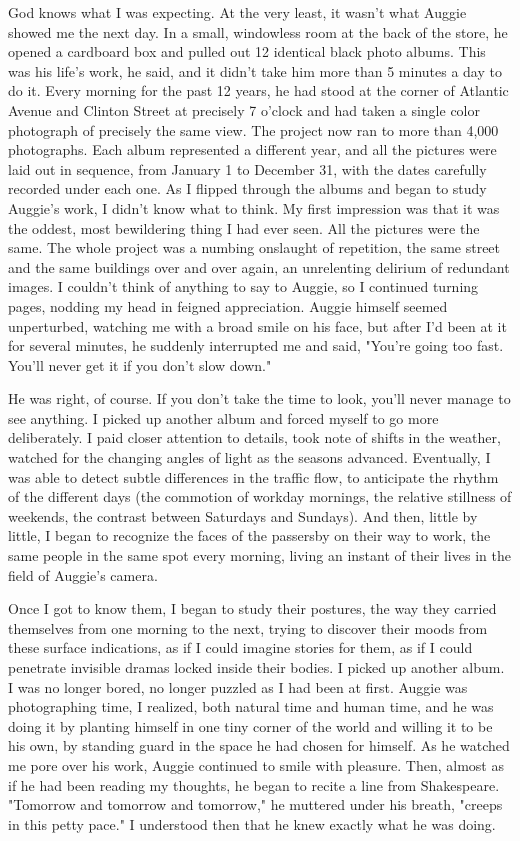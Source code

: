 \documentclass[10pt,a4paper]{article}
\begin{document}
God knows what I was expecting. At the very least, it wasn't what Auggie showed me the next day. In a small, windowless room at the back of the store, he opened a cardboard box and pulled out 12 identical black photo albums. This was his life's work, he said, and it didn't take him more than 5 minutes a day to do it. Every morning for the past 12 years, he had stood at the corner of Atlantic Avenue and Clinton Street at precisely 7 o'clock and had taken a single color photograph of precisely the same view. The project now ran to more than 4,000 photographs. Each album represented a different year, and all the pictures were laid out in sequence, from January 1 to December 31, with the dates carefully recorded under each one.
As I flipped through the albums and began to study Auggie's work, I didn't know what to think. My first impression was that it was the oddest, most bewildering thing I had ever seen. All the pictures were the same. The whole project was a numbing onslaught of repetition, the same street and the same buildings over and over again, an unrelenting delirium of redundant images. I couldn't think of anything to say to Auggie, so I continued turning pages, nodding my head in feigned appreciation. Auggie himself seemed unperturbed, watching me with a broad smile on his face, but after I'd been at it for several minutes, he suddenly interrupted me and said, "You're going too fast. You'll never get it if you don't slow down."

He was right, of course. If you don't take the time to look, you'll never manage to see anything. I picked up another album and forced myself to go more deliberately. I paid closer attention to details, took note of shifts in the weather, watched for the changing angles of light as the seasons advanced. Eventually, I was able to detect subtle differences in the traffic flow, to anticipate the rhythm of the different days (the commotion of workday mornings, the relative stillness of weekends, the contrast between Saturdays and Sundays). And then, little by little, I began to recognize the faces of the passersby on their way to work, the same people in the same spot every morning, living an instant of their lives in the field of Auggie's camera.

Once I got to know them, I began to study their postures, the way they carried themselves from one morning to the next, trying to discover their moods from these surface indications, as if I could imagine stories for them, as if I could penetrate invisible dramas locked inside their bodies. I picked up another album. I was no longer bored, no longer puzzled as I had been at first. Auggie was photographing time, I realized, both natural time and human time, and he was doing it by planting himself in one tiny corner of the world and willing it to be his own, by standing guard in the space he had chosen for himself. As he watched me pore over his work, Auggie continued to smile with pleasure. Then, almost as if he had been reading my thoughts, he began to recite a line from Shakespeare. "Tomorrow and tomorrow and tomorrow," he muttered under his breath, "creeps in this petty pace." I understood then that he knew exactly what he was doing.
\end{document}
